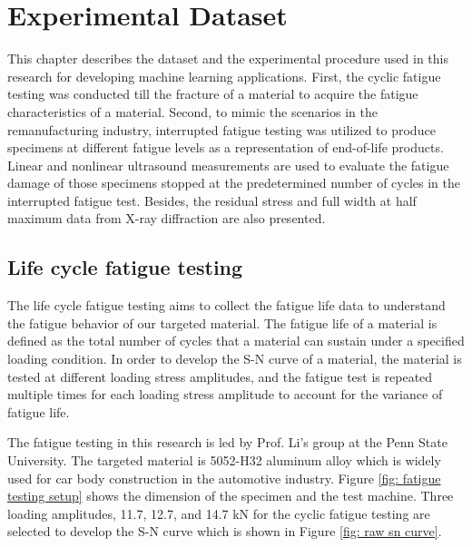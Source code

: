 \chapter{Experimental Dataset}
\label{chap: exper}
This chapter describes the dataset and the experimental procedure used in this research for developing machine learning applications. First, the cyclic fatigue testing was conducted till the fracture of a material to acquire the fatigue characteristics of a material. Second, to mimic the scenarios in the remanufacturing industry, interrupted fatigue testing was utilized to produce specimens at different fatigue levels as a representation of end-of-life products. Linear and nonlinear ultrasound measurements are used to evaluate the fatigue damage of those specimens stopped at the predetermined number of cycles in the interrupted fatigue test. Besides, the residual stress and full width at half maximum data from X-ray diffraction are also presented.

\section{Life cycle fatigue testing}
The life cycle fatigue testing aims to collect the fatigue life data to understand the fatigue behavior of our targeted material. The fatigue life of a material is defined as the total number of cycles that a material can sustain under a specified loading condition. In order to develop the S-N curve of a material, the material is tested at different loading stress amplitudes, and the fatigue test is repeated multiple times for each loading stress amplitude to account for the variance of fatigue life.

The fatigue testing in this research is led by Prof. Li's group at the Penn State University. The targeted material is 5052-H32 aluminum alloy which is widely used for car body construction in the automotive industry. Figure \ref{fig: fatigue testing setup} shows the dimension of the specimen and the test machine. Three loading amplitudes, 11.7, 12.7, and 14.7 kN for the cyclic fatigue testing are selected to develop the S-N curve which is shown in Figure \ref{fig: raw sn curve}. 

